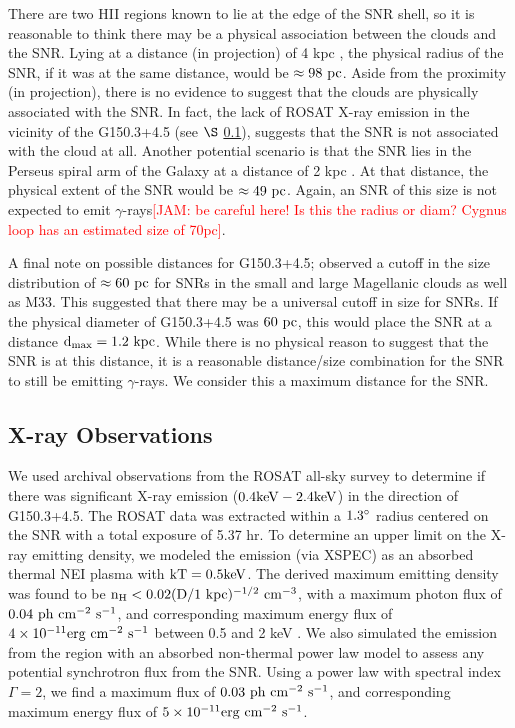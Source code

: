 \documentclass[iop]{emulateapj}
\newcommand{\kibitz}[2]{\ifnum\Comments=1\textcolor{#1}{#2}\fi}
\newcommand{\jamie}[1]{\kibitz{red}      {[JAM: #1]}}
\newcommand{\gam}{$\gamma$-ray}
\newcommand{\Gone}{G150.3+4.5}
\begin{document}
There are two HII regions known to lie at the edge of the SNR shell,  so it is reasonable to think there may be a physical association between the clouds and the SNR. Lying at a distance (in projection) of 4 kpc \citep{Gao14}, the physical radius of the SNR, if it was at the same distance, would be  ${\rm \approx 98~pc}$. Aside from the proximity (in projection), there is no evidence to suggest that the clouds are physically associated with the SNR. In fact, the lack of ROSAT X-ray emission in the vicinity of the \Gone{} (see $\S $ \ref{G150:Xray}), suggests that the SNR is not associated with the cloud at all. Another potential scenario is that the SNR lies in the Perseus spiral arm of the Galaxy at a distance of 2 kpc \citep{Xu06}. At that distance, the physical extent of the SNR would be ${\rm \approx 49~pc}$. Again, an SNR of this size is not expected to emit  \gam{}s\jamie{be careful here! Is this the radius or diam? Cygnus loop has an estimated size of 70pc}.

A final note on possible distances for \Gone{}; \cite{Badenes10}  observed a cutoff in the size distribution of ${\rm \approx 60~pc}$ for SNRs in the small and large Magellanic clouds as well as M33. This suggested that there may be a universal cutoff in size for SNRs. If the physical diameter of \Gone{} was ${\rm 60~pc}$, this would place the SNR at a distance ${\rm d_{max} = 1.2~kpc}$. While there is no physical reason to suggest that the SNR is at this distance, it is a reasonable distance/size combination for the SNR to still be emitting \gam{}s.  We consider this a maximum distance for the SNR.

\subsection{X-ray Observations}\label{G150:Xray}

We used archival observations from the ROSAT all-sky survey \citep{Voges99} to determine if there was significant X-ray emission (${\rm 0.4 keV - 2.4 keV}$) in the direction of \Gone{}. The ROSAT data was extracted within a ${\rm 1.3^\circ}$ radius centered on the SNR with a total exposure of 5.37 hr. To determine an upper limit on the X-ray emitting density, we modeled the emission (via XSPEC) as an absorbed thermal NEI plasma with ${\rm kT=0.5 keV}$. The derived maximum emitting density was found to be ${\rm n_H < 0.02 (D / 1~kpc)^{-1/2}~cm^{-3}}$, with a maximum photon flux  of ${\rm 0.04~ph~cm^{-2}~s^{-1}}$,  and corresponding maximum energy flux of ${\rm 4\times 10^{-11} erg~cm^{-2}~s^{-1}}$ between 0.5 and 2 keV . We also simulated the emission from the region with an absorbed non-thermal power law model to assess any potential synchrotron flux from the SNR. Using a power law with spectral index $\Gamma = 2$, we find a maximum flux of ${\rm 0.03~ph~cm^{-2}~s^{-1}}$, and corresponding maximum energy flux of ${\rm 5\times 10^{-11} erg~cm^{-2}~s^{-1}}$. 
\end{document}
